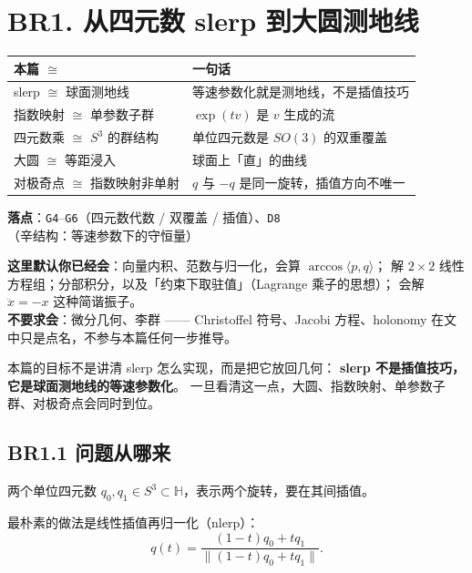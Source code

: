 \section{BR1. 从四元数 slerp 到大圆测地线}
\label{sec:br1}

\begin{center}
\small
\begin{tabular}{L{3.4cm}L{10.4cm}}
\toprule
\textbf{本篇 $\cong$} & \textbf{一句话} \\
\midrule
slerp $\cong$ 球面测地线 & 等速参数化就是测地线，不是插值技巧 \\
指数映射 $\cong$ 单参数子群 & $\exp(tv)$ 是 $v$ 生成的流 \\
四元数乘 $\cong$ $S^3$ 的群结构 & 单位四元数是 $SO(3)$ 的双重覆盖 \\
大圆 $\cong$ 等距浸入 & 球面上「直」的曲线 \\
对极奇点 $\cong$ 指数映射非单射 & $q$ 与 $-q$ 是同一旋转，插值方向不唯一 \\
\bottomrule
\end{tabular}
\end{center}

\noindent\textbf{落点}：\texttt{G4}--\texttt{G6}（四元数代数 / 双覆盖 / 插值）、\texttt{D8}（辛结构：等速参数下的守恒量）

\noindent\small\textbf{这里默认你已经会}：向量内积、范数与归一化，会算 $\arccos\langle p,q\rangle$；
解 $2\times2$ 线性方程组；分部积分，以及「约束下取驻值」（Lagrange 乘子的思想）；
会解 $\ddot x=-x$ 这种简谐振子。\\
\textbf{不要求会}：微分几何、李群 —— Christoffel 符号、Jacobi 方程、holonomy
在文中只是点名，不参与本篇任何一步推导。\normalsize
\smallskip

本篇的目标不是讲清 slerp 怎么实现，而是把它放回几何：
\textbf{slerp 不是插值技巧，它是球面测地线的等速参数化}。
一旦看清这一点，大圆、指数映射、单参数子群、对极奇点会同时到位。

\subsection{BR1.1 问题从哪来}

两个单位四元数 $q_0,q_1\in S^3\subset\mathbb{H}$，表示两个旋转，要在其间插值。

最朴素的做法是线性插值再归一化（nlerp）：
\[
q(t)=\frac{(1-t)q_0+tq_1}{\lVert (1-t)q_0+tq_1\rVert}.
\]

